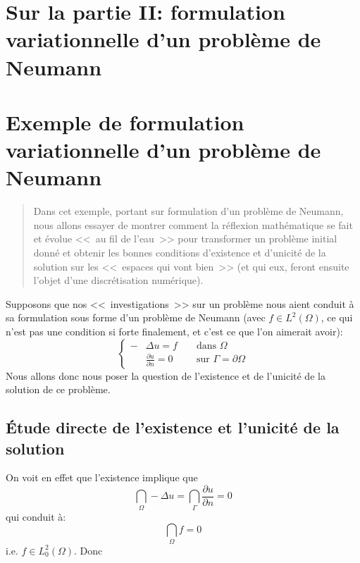 \ifVersionAvecExemplesSepares
   \chapter{Sur la partie II: formulation variationnelle d'un problème de Neumann}
\else
   \chapter{Exemple de formulation variationnelle d'un problème de Neumann}
\fi
\begin{abstract}
Dans cet exemple, portant sur formulation d'un problème de Neumann,
nous allons essayer de montrer comment la réflexion mathématique se
fait et évolue <<~au fil de l'eau~>> pour transformer un problème initial donné et obtenir
les bonnes conditions d'existence et d'unicité de la solution sur les <<~espaces qui vont
bien~>> (et qui eux, feront ensuite l'objet d'une discrétisation numérique).
\end{abstract}

Supposons que nos <<~investigations~>> sur un problème nous aient
conduit à sa formulation sous forme d'un problème de Neumann
(avec $f\in L^2(\Omega)$, ce qui n'est pas une condition si forte finalement, et c'est ce que l'on aimerait avoir):
\begin{equation}\left\{
\begin{aligned}
-&\Delta u = f && \text{ dans } \Omega\\
&\frac{\partial u}{\partial n}=0 && \text{ sur }\Gamma=\partial\Omega
\end{aligned}
\right.
\end{equation}
Nous allons donc nous poser la question de l'existence et de l'unicité de la solution de ce problème.

\medskip
\section{Étude directe de l'existence et l'unicité de la solution}

On voit en effet que l'existence implique que
\begin{equation}\dint_\Omega -\Delta u = \dint_\Gamma \frac{\partial u}{\partial n}=0\end{equation}
qui conduit à:\begin{equation}\dint_\Omega f =0\end{equation} i.e. $f\in L^2_0(\Omega)$.
Donc 

